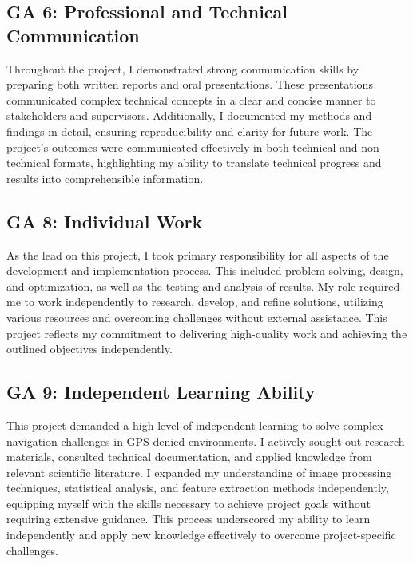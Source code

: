\subsection*{GA 6: Professional and Technical Communication}
Throughout the project, I demonstrated strong communication skills by preparing both written reports and oral presentations. These presentations communicated complex technical concepts in a clear and concise manner to stakeholders and supervisors. Additionally, I documented my methods and findings in detail, ensuring reproducibility and clarity for future work. The project’s outcomes were communicated effectively in both technical and non-technical formats, highlighting my ability to translate technical progress and results into comprehensible information.

\subsection*{GA 8: Individual Work}
As the lead on this project, I took primary responsibility for all aspects of the development and implementation process. This included problem-solving, design, and optimization, as well as the testing and analysis of results. My role required me to work independently to research, develop, and refine solutions, utilizing various resources and overcoming challenges without external assistance. This project reflects my commitment to delivering high-quality work and achieving the outlined objectives independently.

\subsection*{GA 9: Independent Learning Ability}
This project demanded a high level of independent learning to solve complex navigation challenges in GPS-denied environments. I actively sought out research materials, consulted technical documentation, and applied knowledge from relevant scientific literature. I expanded my understanding of image processing techniques, statistical analysis, and feature extraction methods independently, equipping myself with the skills necessary to achieve project goals without requiring extensive guidance. This process underscored my ability to learn independently and apply new knowledge effectively to overcome project-specific challenges.
